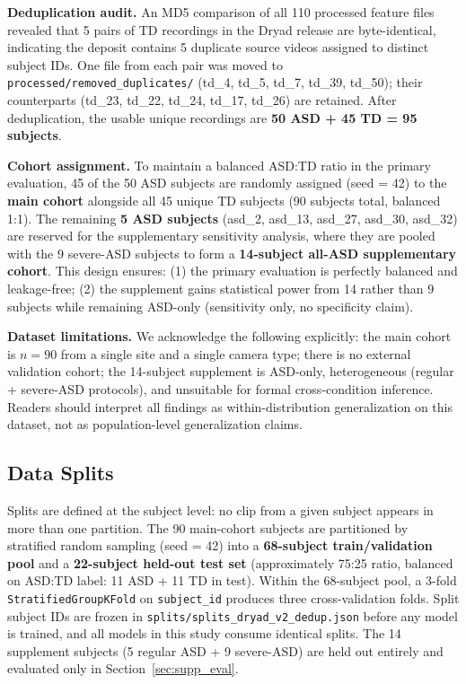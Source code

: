 \documentclass[a4paper,fleqn]{cas-sc}
\begin{document}
\textbf{Deduplication audit.}
An MD5 comparison of all 110 processed feature files revealed that 5 pairs of
TD recordings in the Dryad release are byte-identical, indicating the deposit
contains 5 duplicate source videos assigned to distinct subject IDs.
One file from each pair was moved to \texttt{processed/removed\_duplicates/}
(td\_4, td\_5, td\_7, td\_39, td\_50); their counterparts (td\_23, td\_22,
td\_24, td\_17, td\_26) are retained.
After deduplication, the usable unique recordings are \textbf{50 ASD + 45 TD
= 95 subjects}.

\textbf{Cohort assignment.}
To maintain a balanced ASD:TD ratio in the primary evaluation, 45 of the 50
ASD subjects are randomly assigned (seed = 42) to the \textbf{main cohort}
alongside all 45 unique TD subjects (90 subjects total, balanced 1:1).
The remaining \textbf{5 ASD subjects} (asd\_2, asd\_13, asd\_27, asd\_30,
asd\_32) are reserved for the supplementary sensitivity analysis, where they
are pooled with the 9 severe-ASD subjects to form a \textbf{14-subject
all-ASD supplementary cohort}.
This design ensures: (1) the primary evaluation is perfectly balanced and
leakage-free; (2) the supplement gains statistical power from 14 rather
than 9 subjects while remaining ASD-only (sensitivity only, no specificity claim).

\textbf{Dataset limitations.}
We acknowledge the following explicitly:
the main cohort is $n=90$ from a single site and a single camera type;
there is no external validation cohort;
the 14-subject supplement is ASD-only, heterogeneous (regular + severe-ASD
protocols), and unsuitable for formal cross-condition inference.
Readers should interpret all findings as within-distribution generalization
on this dataset, not as population-level generalization claims.

\subsection{Data Splits}
\label{sec:exp_splits}

Splits are defined at the subject level: no clip from a given subject appears
in more than one partition.
The 90 main-cohort subjects are partitioned by stratified random sampling
(seed = 42) into a \textbf{68-subject train/validation pool} and a
\textbf{22-subject held-out test set} (approximately 75:25 ratio, balanced
on ASD:TD label: 11 ASD + 11 TD in test).
Within the 68-subject pool, a 3-fold \texttt{StratifiedGroupKFold} on
\texttt{subject\_id} produces three cross-validation folds.
Split subject IDs are frozen in \texttt{splits/splits\_dryad\_v2\_dedup.json}
before any model is trained, and all models in this study consume identical splits.
The 14 supplement subjects (5 regular ASD + 9 severe-ASD) are held out
entirely and evaluated only in Section~\ref{sec:supp_eval}.
\end{document}
